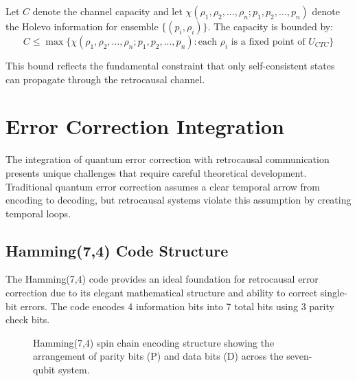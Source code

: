 \documentclass[12pt,a4paper]{article}
\begin{document}
Let $C$ denote the channel capacity and let $\chi(\rho_1, \rho_2, ..., \rho_n; p_1, p_2, ..., p_n)$ denote the Holevo information for ensemble $\{(p_i, \rho_i)\}$. The capacity is bounded by:
\begin{equation}
C \leq \max\{\chi(\rho_1, \rho_2, ..., \rho_n; p_1, p_2, ..., p_n) : \text{each } \rho_i \text{ is a fixed point of } U_{CTC}\}
\end{equation}

This bound reflects the fundamental constraint that only self-consistent states can propagate through the retrocausal channel.

\section{Error Correction Integration}

The integration of quantum error correction with retrocausal communication presents unique challenges that require careful theoretical development. Traditional quantum error correction assumes a clear temporal arrow from encoding to decoding, but retrocausal systems violate this assumption by creating temporal loops.

\subsection{Hamming(7,4) Code Structure}

The Hamming(7,4) code provides an ideal foundation for retrocausal error correction due to its elegant mathematical structure and ability to correct single-bit errors. The code encodes 4 information bits into 7 total bits using 3 parity check bits.

\begin{figure}[H]
\centering
{}
\caption{Hamming(7,4) spin chain encoding structure showing the arrangement of parity bits (P) and data bits (D) across the seven-qubit system.}
\end{figure}
\end{document}
